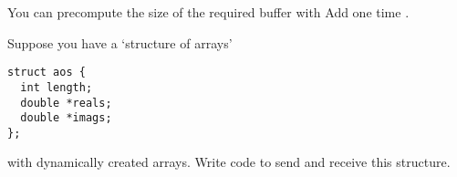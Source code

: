 
You can precompute the size of the required buffer with
%
%
Add one time .

\begin{exercise}
  \label{ex:packAOS}
  Suppose you have a `structure of arrays'
\begin{lstlisting}
struct aos {
  int length;
  double *reals;
  double *imags;
};
\end{lstlisting}
  with dynamically created arrays. Write code to send and receive this
  structure.
\end{exercise}
